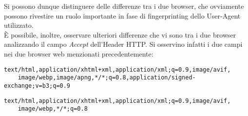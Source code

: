 Si possono dunque distinguere delle differenze tra i due browser, che ovviamente possono rivestire un ruolo importante in fase di fingerprinting dello User-Agent utilizzato.
\\

È possibile, inoltre, osservare ulteriori differenze che vi sono tra i due browser analizzando il campo \textit{Accept} dell'Header HTTP. Si osservino infatti i due campi nei due browser web menzionati precedentemente:
\\


\begin{lstlisting}[caption={Campo \textit{Accept} di richiesta GET di Chrome}]
	text/html,application/xhtml+xml,application/xml;q=0.9,image/avif,
	image/webp,image/apng,*/*;q=0.8,application/signed-exchange;v=b3;q=0.9
\end{lstlisting}

\begin{lstlisting}[caption={Campo \textit{Accept} di richiesta GET di Firefox}]
	text/html,application/xhtml+xml,application/xml;q=0.9,image/avif,
	image/webp,*/*;q=0.8
\end{lstlisting}
















